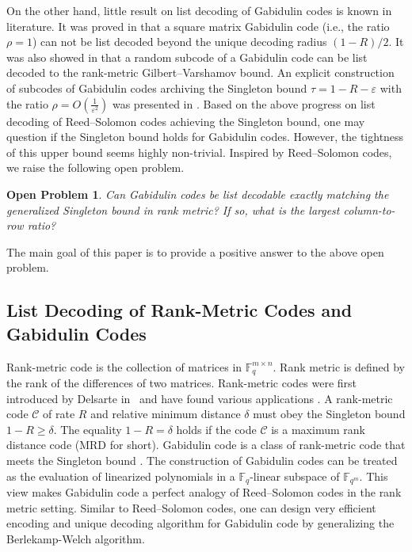\documentclass[11pt]{article}
\newif\ifmynotes
\newcommand{\ZGnote}[1]{\ifmynotes\textcolor{purple}{[Zeyu: #1]}\else\fi}
\theoremstyle{plain}
\newtheorem{Op}[thm]{Open Problem}
\theoremstyle{definition}
\theoremstyle{remark}
\newcommand{\F}{\mathbb{F}}
\renewcommand{\epsilon}{\varepsilon}
\def \mC {\mathcal{C}}
\def \mC {\mathcal{C}}
\begin{document}
On the other hand, little result on list decoding of Gabidulin codes is known in literature. It was proved in \cite{wachter2013bounds} that a square matrix Gabidulin code (i.e., the ratio $\rho=1$) can not be list decoded beyond the unique decoding radius $(1-R)/2$. It was also showed in \cite{LXY18} that a random subcode of a Gabidulin code can be list decoded to the rank-metric Gilbert--Varshamov bound. An explicit construction of subcodes of  Gabidulin codes archiving the Singleton bound $\tau=1-R-\epsilon$ with the ratio $\rho=O\left(\frac1{\epsilon^2}\right)$ was presented in \cite{GX13}. Based on the above progress on list decoding of Reed--Solomon codes achieving the Singleton bound,
one may question if the Singleton bound holds for Gabidulin codes.  However, the tightness of this upper bound seems highly non-trivial. Inspired by Reed--Solomon codes, we raise the following open problem.
\begin{Op}
   Can Gabidulin codes be list decodable exactly matching the generalized Singleton bound in rank metric? If so, what is the largest column-to-row ratio? 
\end{Op}
The main goal of this paper is to provide a positive answer to the above open problem.







\subsection{List Decoding of Rank-Metric Codes and Gabidulin Codes}
Rank-metric code is the collection of matrices in $\F_q^{m\times n}$. Rank metric is defined by the rank of the differences of two matrices. Rank-metric codes were first introduced by Delsarte in~\cite{Del} and have found various applications \cite{KK08,WXS03}. A rank-metric code $\mC$ of rate $R$ and relative minimum distance $\delta$ must obey the Singleton bound $1-R\ge \delta$. The equality $1-R= \delta$ holds if the code $\mC$ is a maximum rank distance code (MRD for short). \ZGnote{Is this the definition of 
MRD?} Gabidulin code is a class of rank-metric code that meets the Singleton bound \cite{G85}. The construction of Gabidulin codes can be treated as the evaluation of linearized polynomials in a $\F_q$-linear subspace of $\F_{q^m}$. This view makes Gabidulin code a perfect analogy of Reed--Solomon codes in the rank metric setting. Similar to Reed--Solomon codes, one can design very efficient encoding and unique decoding algorithm for Gabidulin code \cite{KK08} by generalizing the Berlekamp-Welch algorithm. 
\end{document}
